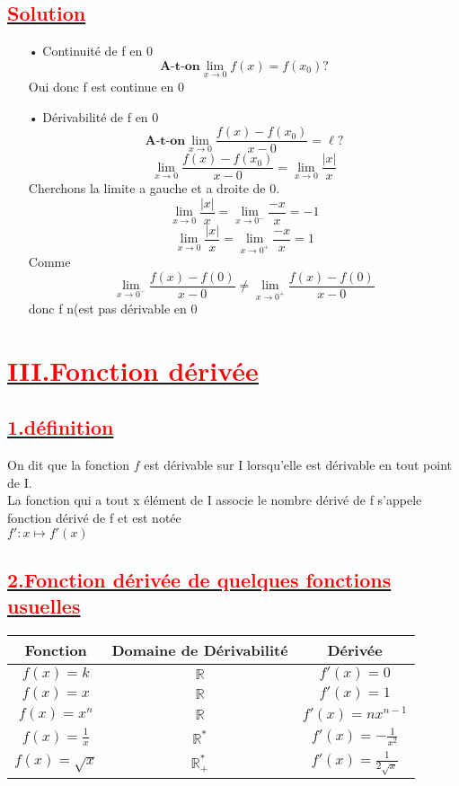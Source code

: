 \documentclass[12pt]{article}
\begin{document}
\subsection*{\underline{\textbf{\textcolor{red}{Solution}}}}
\begin{itemize}
\item[•] Continuité de f en $0$\\
 \[\textbf{A-t-on}\lim_{x \to 0}f(x)=f(x_{0})?\]
 Oui donc f est continue en 0
 \item[•] Dérivabilité de f en $0$\\
 \[\textbf{A-t-on}\lim_{x \to 0}\frac{f(x)-f(x_{0})}{x-0}=\ell?\]
  \[\lim_{x \to 0}\frac{f(x)-f(x_{0})}{x-0}=\lim_{x \to 0}\frac{|x|}{x}\]
  Cherchons la limite a gauche et a droite de 0.
   \[\lim_{x \to 0}\frac{|x|}{x}=\lim_{x \to 0^{-}}\frac{-x}{x}=-1\]
     \[\lim_{x \to 0}\frac{|x|}{x}=\lim_{x \to 0^{+}}\frac{-x}{x}=1\]
     Comme \[\lim_{x \to 0^{-}}\frac{f(x)-f(0)}{x-0}\neq \lim_{x \to 0^{+}}\frac{f(x)-f(0)}{x-0}\] donc f n(est pas dérivable en 0
\end{itemize}
\section*{\underline{\textbf{\textcolor{red}{III.Fonction dérivée}}}}
\subsection*{\underline{\textbf{\textcolor{red}{1.définition}}}}
On dit que la fonction $f$ est dérivable sur I lorsqu'elle est dérivable en tout point de I.\\
La fonction qui a tout x élément de I associe le nombre dérivé de  f s'appele fonction dérivé de f et est notée\\
$f':x\mapsto f'(x)$
\subsection*{\underline{\textbf{\textcolor{red}{2.Fonction dérivée de quelques fonctions usuelles}}}}
\begin{center}
\begin{tabular}{|c|c|c|}
\hline
Fonction &Domaine de Dérivabilité &  Dérivée   \\
\hline
$f(x) = k$& $\mathbb{R}$ & $f'(x)=0$ \\
\hline
$f(x) = x$& $\mathbb{R}$ & $f'(x) = 1$ \\
\hline
$f(x) = x^{n}$& $\mathbb{R}$ & $f'(x) = nx^{n-1}$ \\
\hline
$f(x) = \frac{1}{x}$& $\mathbb{R}^{*}$ & $f'(x) = -\frac{1}{x^{2}}$ \\
\hline
$f(x) = \sqrt{x}$& $\mathbb{R}^{*}_{+}$ & $f'(x) = \frac{1}{2\sqrt{x}}$ \\
\hline
\end{tabular}
\end{center}
\end{document}
